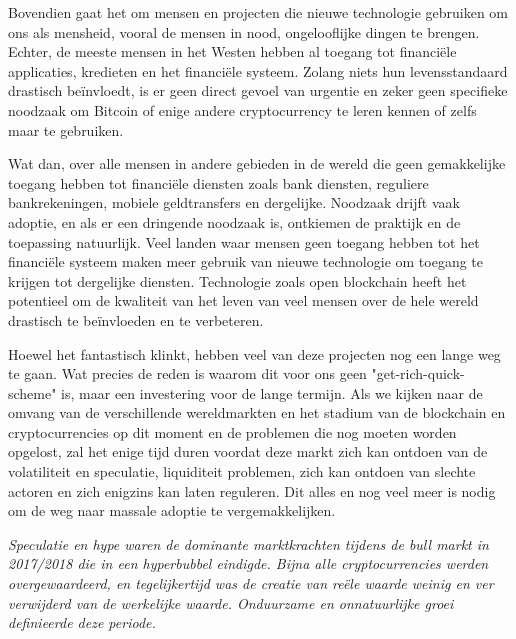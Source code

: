 Bovendien gaat het om mensen en projecten die nieuwe technologie gebruiken om ons als mensheid, vooral de mensen in nood, ongelooflijke dingen te brengen. Echter, de meeste mensen in het Westen hebben al toegang tot financiële applicaties, kredieten en het financi\"ele systeem. Zolang niets hun levensstandaard drastisch be\"invloedt, is er geen direct gevoel van urgentie en zeker geen specifieke noodzaak om Bitcoin of enige andere cryptocurrency te leren kennen of zelfs maar te gebruiken.\medskip

Wat dan, over alle mensen in andere gebieden in de wereld die geen gemakkelijke toegang hebben tot financi\"ele diensten zoals bank diensten, reguliere bankrekeningen, mobiele geldtransfers en dergelijke. Noodzaak drijft vaak adoptie, en als er een dringende noodzaak is, ontkiemen de praktijk en de toepassing natuurlijk. Veel landen waar mensen geen toegang hebben tot het financi\"ele systeem maken meer gebruik van nieuwe technologie om toegang te krijgen tot dergelijke diensten. Technologie zoals open blockchain heeft het potentieel om de kwaliteit van het leven van veel mensen over de hele wereld drastisch te be\"invloeden en te verbeteren. \medskip

Hoewel het fantastisch klinkt, hebben veel van deze projecten nog een lange weg te gaan. Wat precies de reden is waarom dit voor ons geen "get-rich-quick-scheme" is, maar een investering voor de lange termijn. Als we kijken naar de omvang van de verschillende wereldmarkten en het stadium van de blockchain en cryptocurrencies op dit moment en de problemen die nog moeten worden opgelost, zal het enige tijd duren voordat deze markt zich kan ontdoen van de volatiliteit en speculatie, liquiditeit problemen, zich kan ontdoen van slechte actoren en zich enigzins kan laten reguleren. Dit alles en nog veel meer is nodig om de weg naar massale adoptie te vergemakkelijken.

\medskip
{}
    \begin{tcolorbox}
    [enhanced,
    title=Bull Market 2017/2018,
    frame style=
    {left color=orange!85!black,right color=yellow!95!black}]
    
               \textit{Speculatie en hype waren de dominante marktkrachten tijdens de bull markt in 2017/2018 die in een hyperbubbel eindigde. Bijna alle cryptocurrencies werden overgewaardeerd, en tegelijkertijd was de creatie van reële waarde weinig en ver verwijderd van de werkelijke waarde. Onduurzame en onnatuurlijke groei definieerde deze periode.}
\end{tcolorbox}

